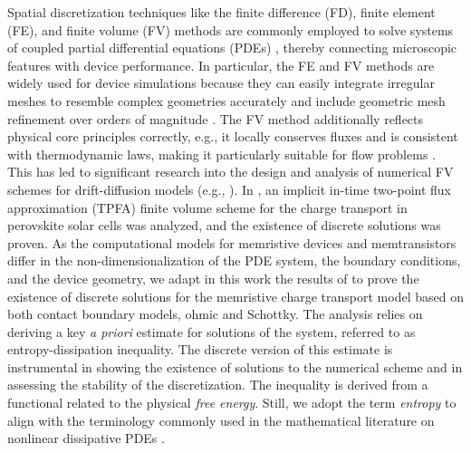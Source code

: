 \documentclass[10pt,a4paper, final]{article}
\theoremstyle{definition}								%
\numberwithin{equation}{section}
\numberwithin{figure}{section}
\numberwithin{theorem}{section}
\begin{document}
Spatial discretization techniques like the finite difference (FD), finite element (FE), and finite volume (FV) methods are commonly employed to solve systems of coupled partial differential equations (PDEs) \cite{Selberherr.1984, Bank.1983, Brezzi.2005, Mock.1983}, thereby connecting microscopic features with device performance.
In particular, the FE and FV methods are widely used for device simulations because they can easily integrate irregular meshes to resemble complex geometries accurately and include geometric mesh refinement over orders of magnitude \cite{Selberherr.1984, Bank.1983, Brezzi.2005, Mock.1983}.
The FV method additionally reflects physical core principles correctly, e.g., it locally conserves fluxes and is consistent with thermodynamic laws, making it particularly suitable for flow problems \cite{Farrell2017a, Eymard.2000}.
This has led to significant research into the design and analysis of numerical FV schemes for drift-diffusion models (e.g., \cite{Cances.2021, Kantner.2020, BessemoulinChatard.2012, BessemoulinChatard.2017, Glitzky.2011, Moatti.2023}).
In \cite{Abdel2023Existence}, an implicit in-time two-point flux approximation (TPFA) finite volume scheme for the charge transport in perovskite solar cells was analyzed, and the existence of discrete solutions was proven.
As the computational models for memristive devices and memtransistors differ in the non-dimensionalization of the PDE system, the boundary conditions, and the device geometry, we adapt in this work the results of \cite{Abdel2023Existence} to prove the existence of discrete solutions for the memristive charge transport model based on both contact boundary models, ohmic and Schottky.
The analysis relies on deriving a key \emph{a priori} estimate for solutions of the system, referred to as entropy-dissipation inequality.
The discrete version of this estimate is instrumental in showing the existence of solutions to the numerical scheme and in assessing the stability of the discretization.
The inequality is derived from a functional related to the physical  \textit{free energy}.
Still, we adopt the term \textit{entropy} to align with the terminology commonly used in the mathematical literature on nonlinear dissipative PDEs \cite{Jungel.2016}.
\end{document}
